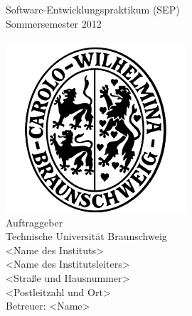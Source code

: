 
\thispagestyle{plain}      %

\begin{titlepage}

\begin{center}

{}\\[5ex]

{}\\[5ex]

Software-Entwicklungspraktikum (SEP)\\
Sommersemester 2012\\[6ex]

{}\\[5ex]

\includegraphics[scale=0.8]{bilder/carolo.jpg}\\[5ex]

Auftraggeber\\
Technische Universität Braunschweig\\
<Name des Instituts>\\
<Name des Institutsleiters>\\
<Straße und Hausnummer>\\
<Postleitzahl und Ort>\\[2ex]
Betreuer: <Name>\\[5ex]


\end{center}
\end{titlepage}
